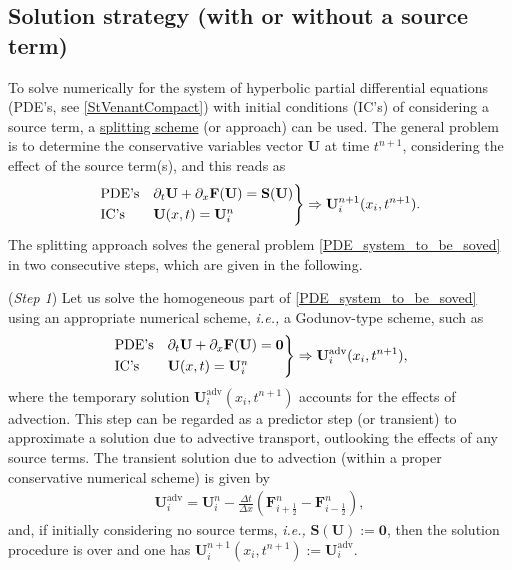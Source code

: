 \documentclass[a4paper]{article}
\numberwithin{equation}{section}
\newcommand{\ie}{\textit{i.e.,} }
\begin{document}
	\subsection{Solution strategy (with or without a source term)}
	To solve numerically for the system of hyperbolic partial differential equations (PDE's, see \ref{StVenantCompact}) with initial conditions (IC's) of considering a source term, a \underline{splitting scheme} (or approach) \parencite{toro2001,castro2019} can be used. The general problem is to determine the conservative variables vector $\mathbf{U}$ at time $t^{n+1}$, considering the effect of the source term(s), and this reads as 
	\begin{align}
		\label{PDE_system_to_be_soved}
		\begin{rcases}
			\text{PDE's} &\partial_t \mathbf{U}+\partial_x \mathbf{F(U)} = \mathbf{S(U)}\\
			\text{IC's} &\mathbf{U}(x,t)=\mathbf{U}_i^n
		\end{rcases} 
		\Rightarrow \mathbf{U}_i^{n+1}(x_i,t^{n+1}).
	\end{align}
	The splitting approach solves the general problem \ref{PDE_system_to_be_soved} in two consecutive steps, which are given in the following.
	
	(\textit{Step 1}) Let us solve the homogeneous part of \ref{PDE_system_to_be_soved} using an appropriate numerical scheme, \ie a Godunov-type scheme, such as
	\begin{align}
		\begin{rcases}
			\text{PDE's} &\partial_t \mathbf{U}+\partial_x \mathbf{F(U)} = \mathbf{0}\\
			\text{IC's} &\mathbf{U}(x,t)=\mathbf{U}_i^n
		\end{rcases} 
		\Rightarrow \mathbf{U}_i^{\mathrm{adv}}(x_i,t^{n+1}),
	\end{align}
	where the temporary solution $\mathbf{U}_i^{\mathrm{adv}}(x_i,t^{n+1})$ accounts for the effects of advection. This step can be regarded as a predictor step (or transient) to approximate a solution due to advective transport, outlooking the effects of any source terms. The transient  solution due to advection (within a proper conservative numerical scheme) is given by
	\begin{align}
		\mathbf{U}_i^{\mathrm{adv}} = \mathbf{U}_i^{n} - \frac{\Delta t}{\Delta x}( \mathbf{F}_{i+\frac{1}{2}}^n - \mathbf{F}_{i-\frac{1}{2}}^n ),
	\end{align}
	and, if initially considering no source terms, \ie $\mathbf{S(U)}:=\mathbf{0}$, then the solution procedure is over and one has $\mathbf{U}_i^{n+1}(x_i,t^{n+1}):=\mathbf{U}_i^{\mathrm{adv}}$. 
	
\end{document}
